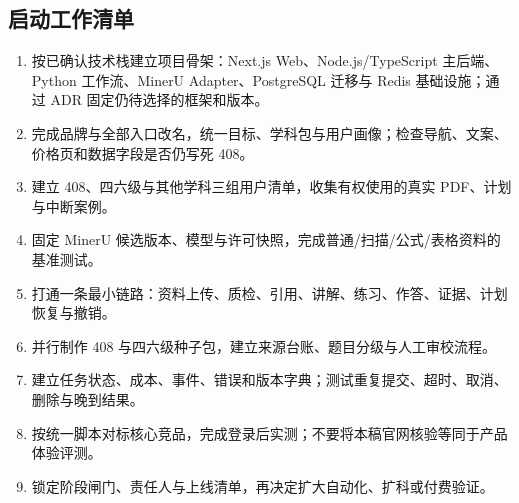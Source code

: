 \documentclass[UTF8,a4paper,11pt,fontset=none]{ctexart}
\begin{document}
\subsection{启动工作清单}
\begin{enumerate}
\item 按已确认技术栈建立项目骨架：Next.js Web、Node.js/TypeScript 主后端、Python 工作流、MinerU Adapter、PostgreSQL 迁移与 Redis 基础设施；通过 ADR 固定仍待选择的框架和版本。
\item 完成品牌与全部入口改名，统一目标、学科包与用户画像；检查导航、文案、价格页和数据字段是否仍写死 408。
\item 建立 408、四六级与其他学科三组用户清单，收集有权使用的真实 PDF、计划与中断案例。
\item 固定 MinerU 候选版本、模型与许可快照，完成普通/扫描/公式/表格资料的基准测试。
\item 打通一条最小链路：资料上传、质检、引用、讲解、练习、作答、证据、计划恢复与撤销。
\item 并行制作 408 与四六级种子包，建立来源台账、题目分级与人工审校流程。
\item 建立任务状态、成本、事件、错误和版本字典；测试重复提交、超时、取消、删除与晚到结果。
\item 按统一脚本对标核心竞品，完成登录后实测；不要将本稿官网核验等同于产品体验评测。
\item 锁定阶段闸门、责任人与上线清单，再决定扩大自动化、扩科或付费验证。
\end{enumerate}
\end{document}

